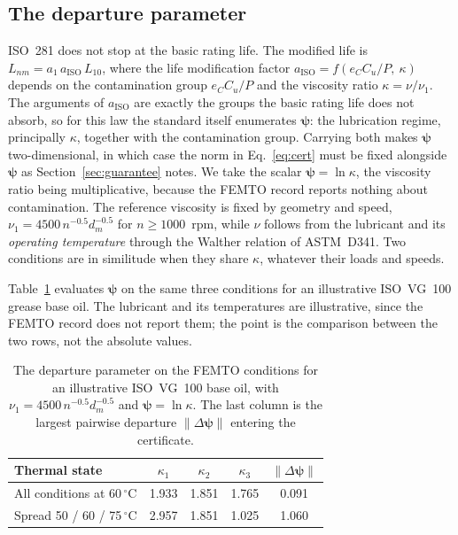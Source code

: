 \subsection*{The departure parameter}
ISO~281 does not stop at the basic rating life. The modified life is
$L_{nm}=a_1\,a_{\mathrm{ISO}}\,L_{10}$, where the life modification factor
$a_{\mathrm{ISO}}=f(e_C C_u/P,\ \kappa)$ depends on the contamination group $e_C C_u/P$ and the
viscosity ratio $\kappa=\nu/\nu_1$. The arguments of $a_{\mathrm{ISO}}$ are exactly the groups the
basic rating life does not absorb, so for this law the standard itself enumerates
$\boldsymbol\psi$: the lubrication regime, principally $\kappa$, together with the contamination
group. Carrying both makes $\boldsymbol\psi$ two-dimensional, in which case the norm in
Eq.~\eqref{eq:cert} must be fixed alongside $\boldsymbol\psi$ as Section~\ref{sec:guarantee} notes. We
take the scalar $\boldsymbol\psi=\ln\kappa$, the viscosity ratio being multiplicative, because the FEMTO
record reports nothing about contamination. The reference
viscosity is fixed by geometry and speed, $\nu_1=4500\,n^{-0.5}d_m^{-0.5}$ for $n\ge1000$~rpm, while
$\nu$ follows from the lubricant and its \emph{operating temperature} through the Walther relation
of ASTM~D341. Two conditions are in similitude when they share $\kappa$, whatever their loads and
speeds.

Table~\ref{tab:bearing-psi} evaluates $\boldsymbol\psi$ on the same three conditions for an
illustrative ISO~VG~100 grease base oil. The lubricant and its temperatures are illustrative, since
the FEMTO record does not report them; the point is the comparison between the two rows, not the
absolute values.

\begin{table}[h]\centering\footnotesize
\setlength{\tabcolsep}{9pt}\renewcommand{\arraystretch}{1.2}
\caption{The departure parameter on the FEMTO conditions for an illustrative ISO~VG~100 base oil,
with $\nu_1=4500\,n^{-0.5}d_m^{-0.5}$ and $\boldsymbol\psi=\ln\kappa$. The last column is the
largest pairwise departure $\lVert\Delta\boldsymbol\psi\rVert$ entering the
certificate.}\label{tab:bearing-psi}
\begin{tabular}{@{}lcccc@{}}\toprule
Thermal state & $\kappa_1$ & $\kappa_2$ & $\kappa_3$ & $\lVert\Delta\boldsymbol\psi\rVert$ \\\midrule
All conditions at 60\,$^\circ$C            & 1.933 & 1.851 & 1.765 & 0.091 \\
Spread 50 / 60 / 75\,$^\circ$C             & 2.957 & 1.851 & 1.025 & 1.060 \\\bottomrule
\end{tabular}
\end{table}

